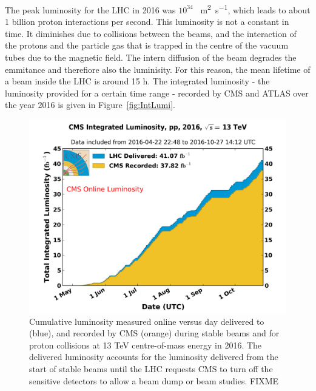 The peak luminosity for the LHC in 2016 was $10^{34}$ \si{\per\square\meter \per\second }, which leads to about 1 billion proton interactions per second. This luminosity is not a constant in time. It diminishes due to collisions between the beams, and the interaction of the protons and the particle gas that is trapped in the centre of the vacuum tubes due to the magnetic field. The intern diffusion of the beam degrades the emmitance and therefiore also the luminisity. For this reason, the mean lifetime of a beam inside the LHC is around 15 \si{ \hour}. The integrated luminosity - the luminosity provided for a certain time range - recorded by CMS and ATLAS over the year 2016 is given in Figure~\ref{fig:IntLumi}.
 \begin{figure}[ht]
 	\centering
	\begin{minipage}[b]{0.4\textwidth}
	\includegraphics[width=\textwidth]{2_ExperimentalSetup/Figures/int_lumi_per_day_cumulative_pp_2016OnlineLumi}
	\caption{Cumulative luminosity measured online versus day delivered to (blue), and recorded by CMS (orange) during stable beams and for proton collisions at 13 TeV centre-of-mass energy in 2016. The delivered luminosity accounts for the luminosity delivered from the start of stable beams until the LHC requests CMS to turn off the sensitive detectors to allow a beam dump or beam studies. FIXME}
    \end{minipage}
\hfill
\begin{minipage}[b]{0.4\textwidth}

\end{minipage}
\end{figure}

